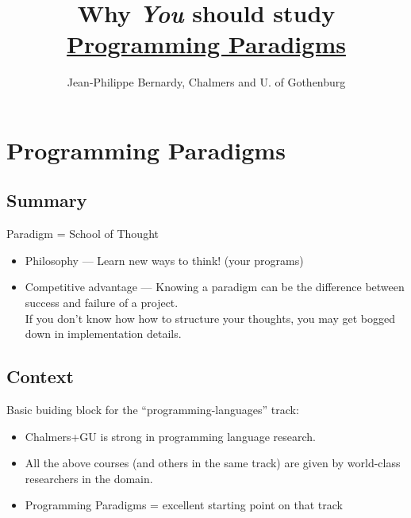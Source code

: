 \documentclass[utf8x,compress,hyperref]{beamer}
\title[Study ProgPar in SP 3 (Jan-Mar)!]{Why \emph{You} should study\\\href{http://www.student.chalmers.se/sp/course?course_code=TDA342}{Programming Paradigms}}
\author[JP Bernardy, Chalmers and GU]{Jean-Philippe Bernardy, Chalmers and U. of Gothenburg}
\begin{document}
\section{Programming Paradigms}
\subsection{Summary}
\begin{frame}
\maketitle
Paradigm = School of Thought
\begin{itemize}
\item Philosophy --- Learn new ways to think! (your programs)
\item Competitive advantage --- Knowing a paradigm can be the
  difference between success and failure of a project. \\
If you don't know how how to structure your thoughts, you may get
bogged down in implementation details.
\end{itemize}

\end{frame}

\subsection{Context}
\begin{frame}

Basic buiding block for the ``programming-languages'' track:

\hspace{2cm}

\begin{itemize}
\item Chalmers+GU is strong in programming language research.
\item All the above courses (and others in the same track) are given
  by world-class researchers in the domain.
\item Programming Paradigms = excellent starting point on that track
\end{itemize}

\end{frame}
\end{document}
